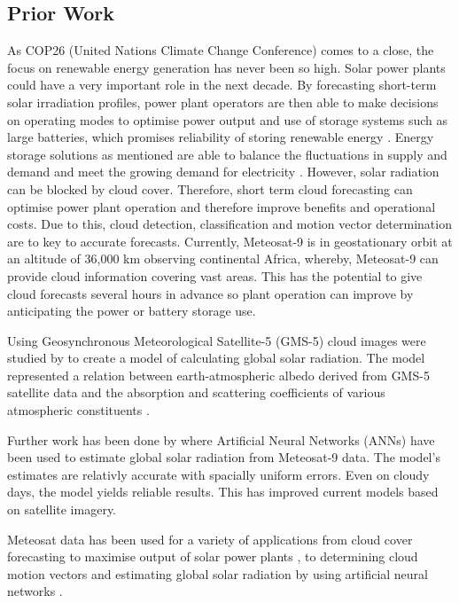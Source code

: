 \subsection{Prior Work}\label{subsec1.3}

As COP26 (United Nations Climate Change Conference) comes to a close, the focus on renewable energy generation has never been so high. Solar power plants could have a very important role in the next decade. By forecasting short-term solar irradiation profiles, power plant operators are then able to make decisions on operating modes to optimise power output and use of storage systems such as large batteries, which promises reliability of storing renewable energy \cite{janjai2009model}. Energy storage solutions as mentioned are able to balance the fluctuations in supply and demand and meet the growing demand for electricity \cite{joseph2006battery}. However, solar radiation can be blocked by cloud cover. Therefore, short term cloud forecasting can optimise power plant operation and therefore improve benefits and operational costs. Due to this, cloud detection, classification and motion vector determination are to key to accurate forecasts. Currently, Meteosat-9 is in geostationary orbit at an altitude of 36,000 km \cite{MS2G} observing continental Africa, whereby, Meteosat-9 can provide cloud information covering vast areas. This has the potential to give cloud forecasts several hours in advance so plant operation can improve by anticipating the power or battery storage use.
\par
Using Geosynchronous Meteorological Satellite-5 (GMS-5) cloud images were studied by \cite{janjai2009model} to create a model of calculating global solar radiation. The model represented a relation between earth-atmospheric albedo derived from GMS-5 satellite data and the absorption and scattering coefficients of various atmospheric constituents \cite{janjai2009model}.
\par
Further work has been done by \cite{globsol_NN} where Artificial Neural Networks (ANNs) have been used to estimate global solar radiation from Meteosat-9 data. The model's estimates are relativly accurate with spacially uniform errors. Even on cloudy days, the model yields reliable results. This has improved current models based on satellite imagery. \cite{janjai2009model}
\par
Meteosat data has been used for a variety of applications from cloud cover forecasting to maximise output of solar power plants \cite{cloud_forcast}, to determining cloud motion vectors \cite{cloudmotion} and estimating global solar radiation by using artificial neural networks \cite{globsol_NN}. 


